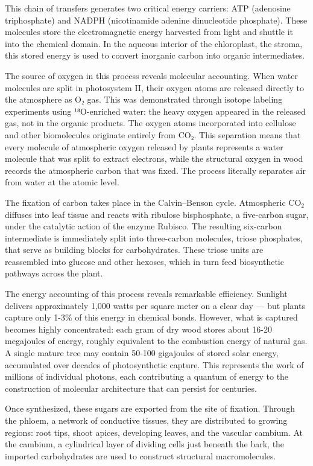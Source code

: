 This chain of transfers generates two critical energy carriers: ATP (adenosine triphosphate) and NADPH (nicotinamide adenine dinucleotide phosphate). These molecules store the electromagnetic energy harvested from light and shuttle it into the chemical domain. In the aqueous interior of the chloroplast, the stroma, this stored energy is used to convert inorganic carbon into organic intermediates.

The source of oxygen in this process reveals molecular accounting. When water molecules are split in photosystem II, their oxygen atoms are released directly to the atmosphere as O₂ gas. This was demonstrated through isotope labeling experiments using ¹⁸O-enriched water: the heavy oxygen appeared in the released gas, not in the organic products. The oxygen atoms incorporated into cellulose and other biomolecules originate entirely from CO₂. This separation means that every molecule of atmospheric oxygen released by plants represents a water molecule that was split to extract electrons, while the structural oxygen in wood records the atmospheric carbon that was fixed. The process literally separates air from water at the atomic level.

The fixation of carbon takes place in the Calvin–Benson cycle. Atmospheric \(\mathrm{CO}_2\) diffuses into leaf tissue and reacts with ribulose bisphosphate, a five-carbon sugar, under the catalytic action of the enzyme Rubisco. The resulting six-carbon intermediate is immediately split into three-carbon molecules, triose phosphates, that serve as building blocks for carbohydrates. These triose units are reassembled into glucose and other hexoses, which in turn feed biosynthetic pathways across the plant.

The energy accounting of this process reveals remarkable efficiency. Sunlight delivers approximately 1,000 watts per square meter on a clear day — but plants capture only 1-3\% of this energy in chemical bonds. However, what is captured becomes highly concentrated: each gram of dry wood stores about 16-20 megajoules of energy, roughly equivalent to the combustion energy of natural gas. A single mature tree may contain 50-100 gigajoules of stored solar energy, accumulated over decades of photosynthetic capture. This represents the work of millions of individual photons, each contributing a quantum of energy to the construction of molecular architecture that can persist for centuries.

Once synthesized, these sugars are exported from the site of fixation. Through the phloem, a network of conductive tissues, they are distributed to growing regions: root tips, shoot apices, developing leaves, and the vascular cambium. At the cambium, a cylindrical layer of dividing cells just beneath the bark, the imported carbohydrates are used to construct structural macromolecules.

